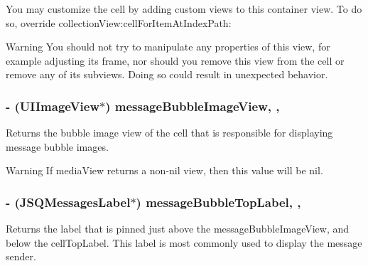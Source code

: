 You may customize the cell by adding custom views to this container view. To do so, override {\ttfamily collection\+View\+:cell\+For\+Item\+At\+Index\+Path\+:}

\begin{DoxyWarning}{Warning}
You should not try to manipulate any properties of this view, for example adjusting its frame, nor should you remove this view from the cell or remove any of its subviews. Doing so could result in unexpected behavior. 
\end{DoxyWarning}
\hypertarget{interface_j_s_q_messages_collection_view_cell_a3488fe5544e3f4f81bd903526170dcbc}{}
\subsubsection[{message\+Bubble\+Image\+View}]{\setlength{\rightskip}{0pt plus 5cm}-\/ (U\+I\+Image\+View$\ast$) message\+Bubble\+Image\+View\hspace{0.3cm}{\ttfamily [read]}, {\ttfamily [nonatomic]}, {\ttfamily [weak]}}\label{interface_j_s_q_messages_collection_view_cell_a3488fe5544e3f4f81bd903526170dcbc}
Returns the bubble image view of the cell that is responsible for displaying message bubble images.

\begin{DoxyWarning}{Warning}
If media\+View returns a non-\/nil view, then this value will be {\ttfamily nil}. 
\end{DoxyWarning}
\hypertarget{interface_j_s_q_messages_collection_view_cell_a98c5acf6e191c92bef28da48b14015b0}{}
\subsubsection[{message\+Bubble\+Top\+Label}]{\setlength{\rightskip}{0pt plus 5cm}-\/ ({\bf J\+S\+Q\+Messages\+Label}$\ast$) message\+Bubble\+Top\+Label\hspace{0.3cm}{\ttfamily [read]}, {\ttfamily [nonatomic]}, {\ttfamily [weak]}}\label{interface_j_s_q_messages_collection_view_cell_a98c5acf6e191c92bef28da48b14015b0}
Returns the label that is pinned just above the message\+Bubble\+Image\+View, and below the cell\+Top\+Label. This label is most commonly used to display the message sender. \hypertarget{interface_j_s_q_messages_collection_view_cell_a64f75d9084b7476a7a2646b14eff105a}{}
